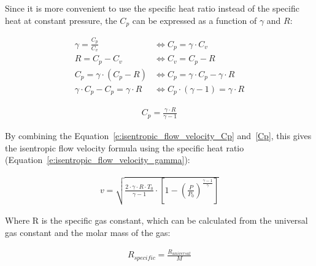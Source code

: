 \documentclass[../main]{subfiles}
\begin{document}
Since it is more convenient to use the specific heat ratio instead of the specific heat at constant pressure, the $C_p$ can be expressed as a function of $\gamma$ and $R$:

\vspace{0mm}
\begin{align*}
\gamma = \frac{C_p}{C_v}
&\Leftrightarrow
C_p = \gamma \cdot C_v \\
R = C_p - C_v
&\Leftrightarrow
C_v = C_p - R \\
C_p = \gamma \cdot (C_p - R)
&\Leftrightarrow
C_p = \gamma \cdot C_p - \gamma \cdot R \\
\gamma \cdot C_p - C_p  = \gamma \cdot R
&\Leftrightarrow
C_p \cdot (\gamma - 1) = \gamma \cdot R
\end{align*}
\vspace{0mm}

\vspace{0mm}
\begin{equation}
\begin{aligned}
C_p = \frac{\gamma \cdot R}{\gamma - 1}
\label{Cp}
\end{aligned}
\end{equation}
\vspace{0mm}

By combining the Equation~\ref{e:isentropic_flow_velocity_Cp} and~\ref{Cp}, this gives the isentropic flow velocity formula using the specific heat ratio (Equation~\ref{e:isentropic_flow_velocity_gamma}):

\vspace{0mm}
\begin{equation}
\begin{aligned}
v = \sqrt{\frac{2 \cdot \gamma \cdot R \cdot T_0}{\gamma - 1} \cdot \left[1 - \left(\frac{P}{P_0}\right)^{\frac{\gamma-1}{\gamma}}\right]}
\label{e:isentropic_flow_velocity_gamma}
\end{aligned}
\end{equation}
\vspace{0mm}

Where R is the specific gas constant, which can be calculated from the universal gas constant and the molar mass of the gas:

\vspace{0mm}
\begin{equation}
\begin{aligned}
R_{specific} = \frac{R_{universal}}{M}
\label{R_specific}
\end{aligned}
\end{equation}
\vspace{0mm}
\end{document}
